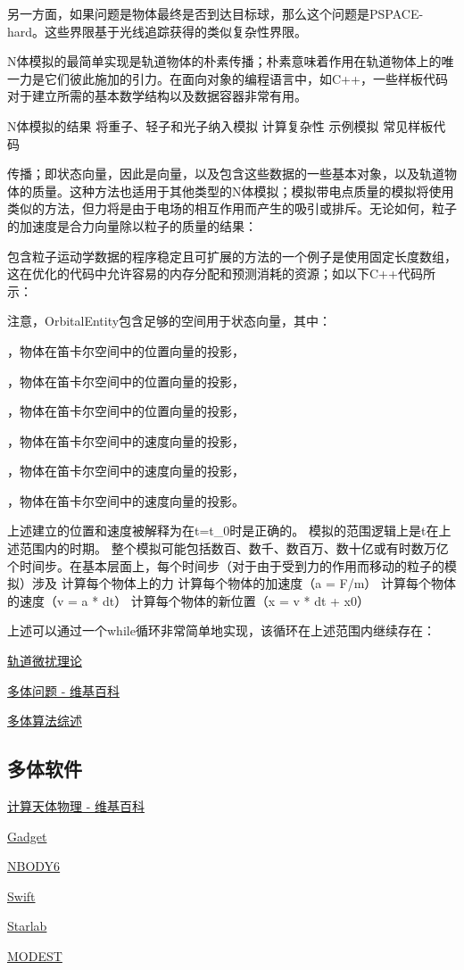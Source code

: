 另一方面，如果问题是物体最终是否到达目标球，那么这个问题是PSPACE-hard。这些界限基于光线追踪获得的类似复杂性界限。

N体模拟的最简单实现是轨道物体的朴素传播；朴素意味着作用在轨道物体上的唯一力是它们彼此施加的引力。在面向对象的编程语言中，如C++，一些样板代码对于建立所需的基本数学结构以及数据容器非常有用。

N体模拟的结果
将重子、轻子和光子纳入模拟
计算复杂性
示例模拟
常见样板代码

传播；即状态向量，因此是向量，以及包含这些数据的一些基本对象，以及轨道物体的质量。这种方法也适用于其他类型的N体模拟；模拟带电点质量的模拟将使用类似的方法，但力将是由于电场的相互作用而产生的吸引或排斥。无论如何，粒子的加速度是合力向量除以粒子的质量的结果：

包含粒子运动学数据的程序稳定且可扩展的方法的一个例子是使用固定长度数组，这在优化的代码中允许容易的内存分配和预测消耗的资源；如以下C++代码所示：

注意，OrbitalEntity包含足够的空间用于状态向量，其中：

，物体在笛卡尔空间中的位置向量的投影，

，物体在笛卡尔空间中的位置向量的投影，

，物体在笛卡尔空间中的位置向量的投影，

，物体在笛卡尔空间中的速度向量的投影，

，物体在笛卡尔空间中的速度向量的投影，

，物体在笛卡尔空间中的速度向量的投影。



上述建立的位置和速度被解释为在t=t_0时是正确的。
模拟的范围逻辑上是t在上述范围内的时期。
整个模拟可能包括数百、数千、数百万、数十亿或有时数万亿个时间步。在基本层面上，每个时间步（对于由于受到力的作用而移动的粒子的模拟）涉及
计算每个物体上的力
计算每个物体的加速度（a = F/m）
计算每个物体的速度（v = a * dt）
计算每个物体的新位置（x = v * dt + x0）

上述可以通过一个while循环非常简单地实现，该循环在上述范围内继续存在：






\href{https://en.wikipedia.org/wiki/Orbit_modeling}{轨道微扰理论}

\href{https://en.wikipedia.org/wiki/N-body_problem}{多体问题 - 维基百科}

\href{https://arxiv.org/abs/0806.3950v1}{多体算法综述}

\subsection{多体软件}

\href{https://en.wikipedia.org/wiki/Computational_astrophysics}{计算天体物理 - 维基百科}

\href{https://wwwmpa.mpa-garching.mpg.de/gadget/}{Gadget}

\href{https://people.ast.cam.ac.uk/~sverre/web/pages/nbody.htm}{NBODY6}

\href{https://www.boulder.swri.edu/~hal/swift.html}{Swift}

\href{https://www.sns.ias.edu/~starlab/}{Starlab}

\href{http://www.manybody.org/modest/}{MODEST}
